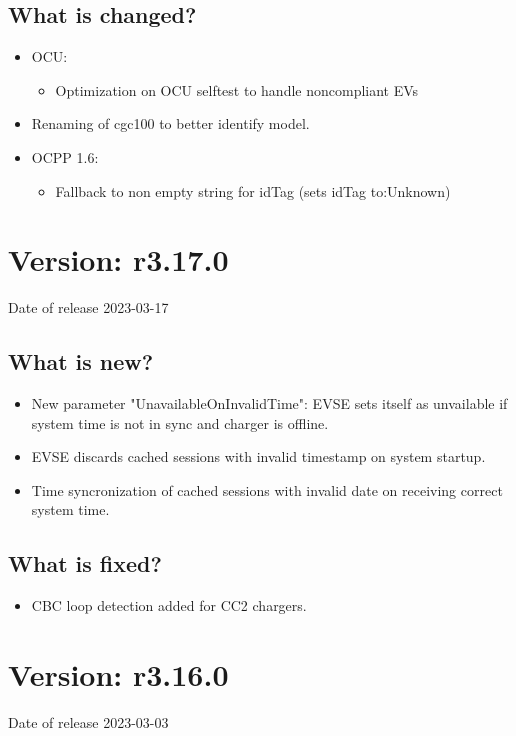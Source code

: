 \documentclass{scrartcl}
\begin{document}
\subsection*{What is changed?}

\begin{itemize}
\item OCU:
    \begin{itemize}
      \item Optimization on OCU selftest to handle noncompliant EVs
    \end{itemize}
\item Renaming of cgc100 to better identify model.
\item OCPP 1.6:
    \begin{itemize}
      \item Fallback to non empty string for idTag (sets idTag to:Unknown)
    \end{itemize}
\end{itemize}

\section{Version: r3.17.0}
Date of release 2023-03-17
\subsection*{What is new?}
\begin{itemize}
  \item New parameter "UnavailableOnInvalidTime": EVSE sets itself as unvailable if system time is not in sync and charger is offline.
  \item EVSE discards cached sessions with invalid timestamp on system startup.
  \item Time syncronization of cached sessions with invalid date on receiving correct system time.
\end{itemize}
\subsection*{What is fixed?}
\begin{itemize}
\item CBC loop detection added for CC2 chargers.
\end{itemize}

\section{Version: r3.16.0}
Date of release 2023-03-03
\end{document}
